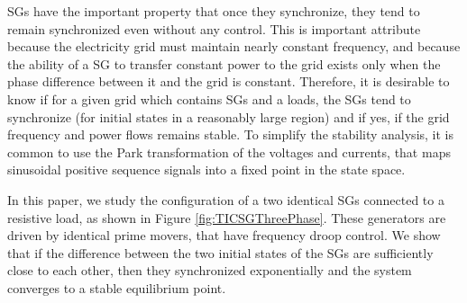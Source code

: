 \documentclass[letterpaper, 10 pt, conference]{ieeeconf}  %
\begin{document}
SGs have the important property that once they synchronize, they tend
to remain synchronized even without any control. This is important
attribute because the electricity grid must maintain nearly constant
frequency, and because the ability of a SG to transfer constant power
to the grid exists only when the phase difference between it and the
grid is constant. Therefore, it is desirable to know if for a given
grid which contains SGs and a loads, the SGs tend to synchronize (for
initial states in a reasonably large region) and if yes, if the grid
frequency and power flows remains stable. To simplify the stability
analysis, it is common to use the Park transformation of the voltages
and currents, that maps sinusoidal positive sequence signals into a
fixed point in the state space.

In this paper, we study the configuration of a two identical SGs connected to a resistive  load, as shown in Figure \ref{fig:TICSGThreePhase}. These generators are driven by identical prime movers, that have frequency droop control. We show that if the difference between the two initial states of the SGs are sufficiently close to each other, then they synchronized exponentially and the system converges to a stable equilibrium point.   
\end{document}
